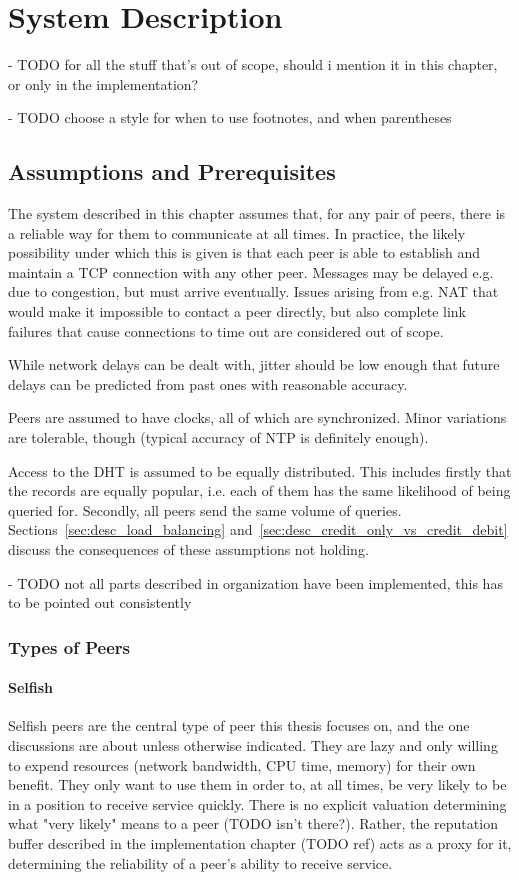 \chapter{System Description}
\label{chap:system_description}
- TODO for all the stuff that's out of scope, should i mention it in this
  chapter, or only in the implementation?

- TODO choose a style for when to use footnotes, and when parentheses

\section{Assumptions and Prerequisites}
The system described in this chapter assumes that, for any pair of peers, there
is a reliable way for them to communicate at all times. In practice, the likely
possibility under which this is given is that each peer is able to establish and
maintain a TCP connection with any other peer. Messages may be delayed e.g. due
to congestion, but must arrive eventually. Issues arising from e.g. NAT that
would make it impossible to contact a peer directly, but also complete link
failures that cause connections to time out are considered out of scope.

While network delays can be dealt with, jitter should be low enough that future
delays can be predicted from past ones with reasonable accuracy.

Peers are assumed to have clocks, all of which are synchronized. Minor
variations are tolerable, though (typical accuracy of NTP is definitely enough).

Access to the \ac{DHT} is assumed to be equally distributed. This includes
firstly that the records are equally popular, i.e. each of them has the same
likelihood of being queried for. Secondly, all peers send the same volume of
queries. Sections~\ref{sec:desc_load_balancing}
and~\ref{sec:desc_credit_only_vs_credit_debit} discuss the consequences of these
assumptions not holding.

- TODO not all parts described in organization have been implemented, this has
  to be pointed out consistently

\subsection{Types of Peers}
\subsubsection{Selfish}
Selfish peers are the central type of peer this thesis focuses on, and the one
discussions are about unless otherwise indicated. They are lazy and only willing
to expend resources (network bandwidth, CPU time, memory) for their own benefit.
They only want to use them in order to, at all times, be very likely to be in a
position to receive service quickly. There is no explicit valuation determining
what "very likely" means to a peer (TODO isn't there?). Rather, the reputation
buffer described in the implementation chapter (TODO ref) acts as a proxy for
it, determining the reliability of a peer's ability to receive service.

